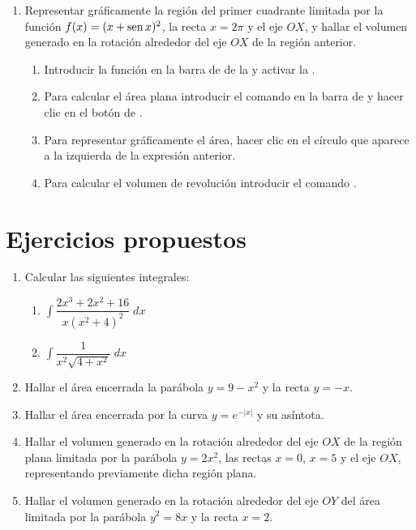 \begin{enumerate}[leftmargin=*]
\item Representar gráficamente la región del primer cuadrante limitada por la función $f(x)=(x+\operatorname{sen} x)^2$, la recta $x=2\pi$ y el eje $OX$, y hallar el volumen generado en la rotación alrededor del eje $OX$ de la región anterior.
      \begin{indication}
      \begin{enumerate}
      \item Introducir la función  en la barra de  de la  y activar la .
      \item Para calcular el área plana introducir el comando  en la barra de  y hacer clic en el botón de .
      \item Para representar gráficamente el área, hacer clic en el círculo que aparece a la izquierda de la expresión anterior.
      \item Para calcular el volumen de revolución introducir el comando .
      \end{enumerate}
      \end{indication}

\end{enumerate}


\section{Ejercicios propuestos}
\begin{enumerate}[leftmargin=*]
\item Calcular las siguientes integrales:
      \begin{enumerate}
      \item $ \int{\dfrac{2x^{3}+2x^{2}+16}{x(x^{2}+4)^{2}}\;dx}$
      \item $ \int{\dfrac{1}{x^{2}\sqrt{4+x^{2}}}\;dx}$
      \end{enumerate}

\item Hallar el área encerrada la parábola $y=9-x^{2}$ y la recta $y=-x$.

\item Hallar el área encerrada por la curva $y=e^{-|x|}$ y su asíntota.

\item Hallar el volumen generado en la rotación alrededor del eje $OX$ de la región plana limitada por la parábola $y=2x^{2}$, las rectas
      $x=0$, $x=5$ y el eje $OX$, representando previamente dicha región plana.

\item Hallar el volumen generado en la rotación alrededor del eje $OY$ del área limitada por la parábola $y^{2}=8x$ y la recta $x=2$.

\end{enumerate}
